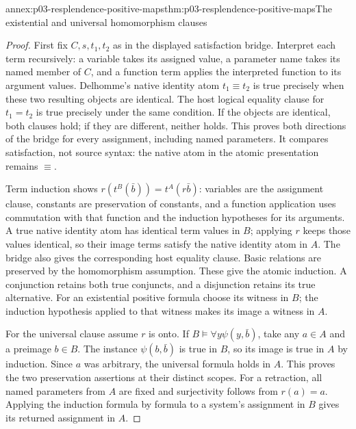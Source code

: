 \begin{annexitem}{annex:p03-resplendence-positive-maps}{thm:p03-resplendence-positive-maps}{The existential and universal homomorphism clauses}
\begin{proof}
First fix \(C,s,t_1,t_2\) as in the displayed satisfaction bridge.
Interpret each term recursively: a variable takes its assigned value,
a parameter name takes its named member of \(C\), and a function term
applies the interpreted function to its argument values. Delhomme's
native identity atom \(t_1\equiv t_2\) is true precisely when these
two resulting objects are identical. The host logical equality clause
for \(t_1=t_2\) is true precisely under the same condition. If the
objects are identical, both clauses hold; if they are different, neither
holds. This proves both directions of the bridge for every assignment,
including named parameters. It compares satisfaction, not source syntax:
the native atom in the atomic presentation remains \(\equiv\).

Term induction shows \(r(t^B(\bar b))=t^A(r\bar b)\): variables are
the assignment clause, constants are preservation of constants, and a
function application uses commutation with that function and the induction
hypotheses for its arguments. A true native identity atom has identical
term values in \(B\); applying \(r\) keeps those values identical,
so their image terms satisfy the native identity atom in \(A\).
The bridge also gives the corresponding host equality clause. Basic
relations are preserved by the homomorphism assumption. These give the
atomic induction. A conjunction retains both true conjuncts, and a
disjunction retains its true alternative. For an existential positive
formula choose its witness in \(B\); the induction hypothesis applied
to that witness makes its image a witness in \(A\).

For the universal clause assume \(r\) is onto. If
\(B\models\forall y\psi(y,\bar b)\), take any \(a\in A\) and a
preimage \(b\in B\). The instance \(\psi(b,\bar b)\) is true in
\(B\), so its image is true in \(A\) by induction. Since \(a\)
was arbitrary, the universal formula holds in \(A\). This proves the
two preservation assertions at their distinct scopes. For a retraction,
all named parameters from \(A\) are fixed and surjectivity follows from
\(r(a)=a\). Applying the induction formula by formula to a system's
assignment in \(B\) gives its returned assignment in \(A\).
\end{proof}
\end{annexitem}

